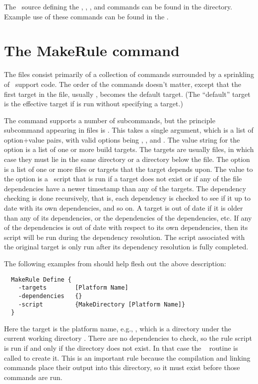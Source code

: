 The \Tcl\ source defining the , ,
, and  commands can be found in the
 directory. Example use of these commands can be
found in the .

\section{The MakeRule command}\label{sec:makerule}
The  files consist primarily of a collection of
 commands surrounded by a sprinkling of \Tcl\ support
code. The order of the  commands doesn't matter, except
that the first target in the file, usually , becomes the default
target. (The ``default'' target is the effective target if 
is run without specifying a target.)

The  command supports a number of subcommands, but the
principle subcommand appearing in  files is
. This takes a single argument, which is a list of
option+value pairs, with valid options being ,
, and . The value string for the
 option is a list of one or more build targets. The targets
are usually files, in which case they must lie in the same directory or
a directory below the  file. The 
option is a list of one or more files or targets that the target depends
upon. The value to the  option is a \Tcl\ script that is run
if a target does not exist or if any of the file dependencies have a
newer timestamp than any of the targets. The dependency checking is done
recursively, that is, each dependency is checked to see if it up to date
with its own dependencies, and so on.  A target is out of date if it is
older than any of its dependencies, or the dependencies of the
dependencies, etc. If any of the dependencies is out of date with
respect to its own dependencies, then its script will be run during the
dependency resolution. The script associated with the original target is
only run after its dependency resolution is fully completed.

The following examples from 
should help flesh out the above description:
\begin{verbatim}
  MakeRule Define {
    -targets        [Platform Name]
    -dependencies   {}
    -script         {MakeDirectory [Platform Name]}
  }
\end{verbatim}
Here the target is the platform name, e.g., , which
is a directory under the current working directory
. There are no dependencies to check, so the rule
script is run if and only if the directory  does not
exist. In that case the \OOMMF\  routine is called to
create it. This is an important rule because the compilation and linking
commands place their output into this directory, so it must exist before
those commands are run.

